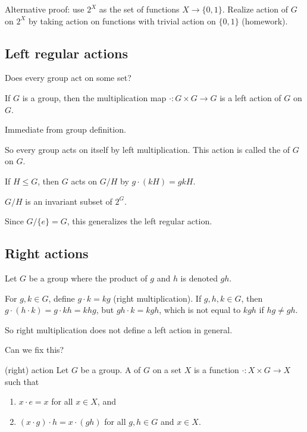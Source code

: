 \documentclass[12pt,letterpaper]{report}
\begin{document}
Alternative proof: use $2^X$ as the set of functions $X \to \{0, 1\}$.
Realize action of $G$ on $2^X$ by taking action on functions with trivial action on $\{0, 1\}$
(homework).

\pagebreak
\subsection{Left regular actions}

Does every group act on some set?

\begin{lem}{}{}
  If $G$ is a group, then the multiplication map $\cdot \colon G \times G \to G$ is a left action
  of $G$ on $G$.
\end{lem}

\begin{thmproof}
  Immediate from group definition.
\end{thmproof}

So every group acts on itself by left multiplication.
This action is called the  of $G$ on $G$.

\begin{lem}{}{}
  If $H \leq G$, then $G$ acts on $G/H$ by $g \cdot (kH) = gkH$.
\end{lem}

\begin{thmproof}
  $G/H$ is an invariant subset of $2^G$.
\end{thmproof}

Since $G/\{e\} = G$, this generalizes the left regular action.

\pagebreak
\subsection{Right actions}

\begin{ex}
  Let $G$ be a group where the product of $g$ and $h$ is denoted $gh$.

  For $g, k \in G$, define $g \cdot k = kg$ (right multiplication).
  If $g, h, k \in G$, then $g \cdot (h \cdot k) = g \cdot kh = khg$, but $gh \cdot k = kgh$, which
  is not equal to $kgh$ if $hg \neq gh$.

  So right multiplication does not define a left action in general.
\end{ex}

Can we fix this?

\begin{defn}{(right) action}{}
  Let $G$ be a group.
  A  of $G$ on a set $X$ is a function $\cdot \colon X \times G \to X$ such
  that
  \begin{enumerate}
    \item $x \cdot e = x$ for all $x \in X$, and
    \item $(x \cdot g) \cdot h = x \cdot (gh)$ for all $g, h \in G$ and $x \in X$.
  \end{enumerate}
\end{defn}
\end{document}
